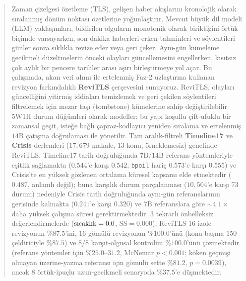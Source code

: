 ﻿\documentclass[journal]{IEEEtran}
\begin{document}
\begin{abstract}
Zaman \c{c}izelgesi \"{o}zetleme (TLS), geli\c{s}en haber ak{\i}\c{s}lar{\i}n{\i} kronolojik olarak s{\i}ralanm{\i}\c{s} d\"{o}n\"{u}m noktas{\i} \"{o}zetlerine yo\u{g}unla\c{s}t{\i}r{\i}r. Mevcut b\"{u}y\"{u}k dil modeli (LLM) yakla\c{s}{\i}mlar{\i}, bildirilen olgular{\i}n monotonik olarak birikti\u{g}ini \"{o}rt\"{u}k bi\c{c}imde varsayarken, son dakika haberleri erken tahminleri ve s\"{o}ylentileri g\"{u}nler sonra s{\i}kl{\i}kla revize eder veya geri \c{c}eker. Ayn{\i}-g\"{u}n k\"{u}meleme gecikmeli d\"{u}zeltmelerin \"{o}nceki olaylar{\i} g\"{u}ncellemesini engellerken, k{\i}s{\i}ts{\i}z \c{c}ok ayl{\i}k bir pencere tarihler aras{\i} a\c{s}{\i}r{\i} birle\c{s}tirmeye yol a\c{c}ar. Bu \c{c}al{\i}\c{s}mada, akan veri al{\i}m{\i} ile ertelenmi\c{s} Faz-2 uzla\c{s}t{\i}rma kullanan revizyon fark{\i}ndal{\i}kl{\i} \textbf{ReviTLS} \c{c}erçevesini sunuyoruz. ReviTLS, olaylar{\i} g\"{u}ncelli\u{g}ini yitirmi\c{s} iddialar{\i} temizlemek ve geri \c{c}ekilen s\"{o}ylentileri filtrelemek i\c{c}in mezar ta\c{s}{\i} (tombstone) k\"{u}melerine sahip de\u{g}i\c{s}tirilebilir $5\text{W}1\text{H}$ durum d\"{u}\u{g}\"{u}mleri olarak modeller; bu yap{\i} ko\c{s}ullu \c{c}ift-ufuklu bir zamansal ge\c{c}it, iste\u{g}e ba\u{g}l{\i} \c{c}apraz-kodlay{\i}c{\i} yeniden s{\i}ralama ve ertelenmi\c{s} $14\text{B}$ \c{c}at{\i}\c{s}ma do\u{g}rulamas{\i} ile y\"{o}netilir. Tam aral{\i}k-filtreli \textbf{Timeline17} ve \textbf{Crisis} derlemleri ($17{,}679$ makale, $13$ konu, \"{o}rneklemesiz) genelinde ReviTLS, Timeline17 tarih do\u{g}rulu\u{g}unda $7\text{B}/14\text{B}$ referans y\"{o}ntemleriyle e\c{s}itlik sa\u{g}lamakta ($0.544$'e kar\c{s}{\i} $0.542$; \texttt{bpoil} hari\c{c} $0.573$'e kar\c{s}{\i} $0.555$) ve Crisis'te en y\"{u}ksek g\"{o}zlenen ortalama k\"{u}resel kapsam{\i} elde etmektedir ($0.487$, anlaml{\i} de\u{g}il); buna kar\c{s}{\i}l{\i}k durum par\c{c}alanmas{\i} ($10{,}504$'e kar\c{s}{\i} $73$ durum) nedeniyle Crisis tarih do\u{g}rulu\u{g}unda ayn{\i}-g\"{u}n referanslar{\i}n{\i}n gerisinde kalmakta ($0.241$'e kar\c{s}{\i} $0.320$) ve $7\text{B}$ referanslara g\"{o}re $\sim 4.1\times$ daha y\"{u}ksek \c{c}al{\i}\c{s}ma s\"{u}resi gerektirmektedir. $3$ tekrarl{\i} \"{o}nbelleksiz de\u{g}erlendirmelerde ($\text{s{\i}cakl{\i}k}=0.0$, $\text{SS}=0.000$), ReviTLS $16$ izole revizyonun $\%87.5$'ini, $16$ g\"{o}m\"{u}l\"{u} revizyonun $\%100.0$'\"{u}n\"{u} (konu ba\c{s}{\i}na $150$ \c{c}eldiriciyle $\%87.5$) ve $8/8$ kar\c{s}{\i}t-olgusal kontrol\"{u}n $\%100.0$'\"{u}n\"{u} \c{c}\"{o}zmektedir (referans y\"{o}ntemler i\c{c}in $\%25.0\text{--}31.2$, McNemar $p < 0.001$; k\"{o}ken ge\c{c}mi\c{s}i olmayan \"{u}zerine-yazma referans{\i} i\c{c}in g\"{o}m\"{u}l\"{u} sette $\%81.2$, $p = 0.0039$), ancak $8$ \"{o}rt\"{u}k-ipu\c{c}lu uzun-gecikmeli senaryoda $\%37.5$'e d\"{u}\c{s}mektedir.
\end{abstract}
\end{document}
